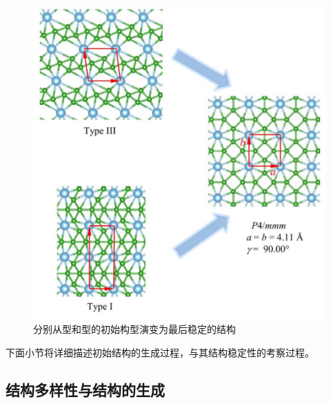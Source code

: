 \begin{figure}
  \includegraphics[width=1.0\textwidth]{figs/ch5_cell_change.png}
  \centering
  \caption{分别从型和型的初始构型演变为最后稳定的结构}
  \label{fig:ch5_cell_change}
\end{figure}

下面小节将详细描述初始结构的生成过程，与其结构稳定性的考察过程。

\subsection{结构多样性与结构的生成}

